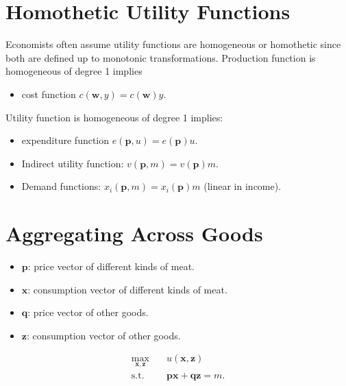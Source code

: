 \section{Homothetic Utility Functions}


Economists often assume utility functions are homogeneous or homothetic since both are defined up to monotonic transformations.
Production function is homogeneous of degree 1 implies 
\begin{itemize}
    \item cost function $c(\mathbf{w}, y) = c(\mathbf{w})y$.
\end{itemize}
\noindent Utility function is homogeneous of degree 1 implies:
\begin{itemize}
    \item expenditure function $e(\mathbf{p}, u) = e(\mathbf{p})u$.
    \item Indirect utility function: $v(\mathbf{p}, m) = v(\mathbf{p})m$.
    \item Demand functions: $x_i(\mathbf{p}, m) = x_i(\mathbf{p})m$ (linear in income).
\end{itemize}


\section{Aggregating Across Goods}

\begin{itemize}
    \item $\mathbf{p}$: price vector of different kinds of meat.
    \item $\mathbf{x}$: consumption vector of different kinds of meat.
    \item $\mathbf{q}$: price vector of other goods.
    \item $\mathbf{z}$: consumption vector of other goods.
\end{itemize}

\[
\begin{aligned}
\underset{\mathbf{x}, \mathbf{z}}{\max} &\quad u(\mathbf{x}, \mathbf{z}) \\
\text{s.t.} &\quad \mathbf{px} + \mathbf{qz} = m.
\end{aligned}
\]

